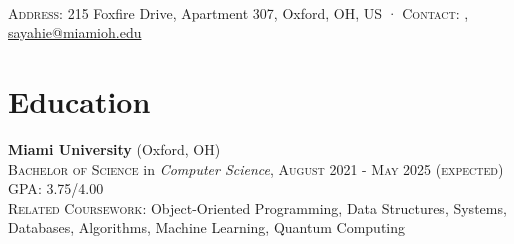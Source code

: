 \documentclass[letterpaper,8pt]{article} %
\begin{document}
\pagestyle{empty} %


\par
{\\

\footnotesize{
\textsc{Address:} 215 Foxfire Drive, Apartment 307, Oxford, OH, US
·
\textsc{Contact:} \href{tel:+1-513-484-0972}{\color{black}{+1 (513) 484-0972}}, \href{mailto:sayahie@miamioh.edu}{\color{black}sayahie@miamioh.edu}\\
}\normalsize
\bigskip\par} %




\section{Education}

\textbf{Miami University} (Oxford, OH)\\
\textsc{Bachelor of Science} in \emph{Computer Science}, \textsc{August 2021 - May 2025 (expected)}\\
\footnotesize \textsc{GPA}: 3.75/4.00\normalsize \\
\footnotesize \textsc{Related Coursework}: \scriptsize{Object-Oriented Programming, Data Structures, Systems, Databases, Algorithms, Machine Learning, Quantum Computing}\\
\end{document}
